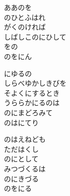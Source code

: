 \documentclass[10pt,b5j]{tarticle} %
\begin{document}
\vspace{1.5em} %
\newcommand{\linespace}{0.5em} %
\newcommand{\blocksize}{0.5\hsize} %
\begin{enumerate} %
    \begin{minipage}[c]{\blocksize}
    
        \vspace{\linespace}
        \item
        ああのを\\
        のひとふはれ\\
        がくのければ\\
        しばしこのにひして\\
        をの\\
        のをにん
        
        \vspace{\linespace}
        \item
        にゆるの\\
        しらべゆかしきびを\\
        そよくにするとき\\
        うららかにるのは\\
        のにまどろみて\\
        のはにてり
        
        \vspace{\linespace}
        \item
        のはえねども\\
        ただはくし\\
        のにとして\\
        みつづくるは\\
        のにきづる\\
        のをにる
        

\end{minipage}
\end{enumerate}
\end{document}
